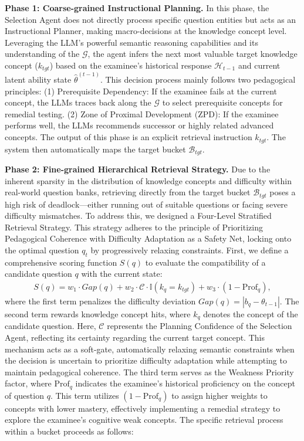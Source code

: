 \textbf{Phase 1: Coarse-grained Instructional Planning.} In this phase, the Selection Agent does not directly process specific question entities but acts as an Instructional Planner, making macro-decisions at the knowledge concept level. Leveraging the LLM's powerful semantic reasoning capabilities and its understanding of the  $\mathcal{G}$, the agent infers the next most valuable target knowledge concept ($k_{tgt}$) based on the examinee's historical response  $\mathcal{H}_{t-1}$ and current latent ability state $\hat{\theta}^{(t-1)}$. This decision process mainly follows two pedagogical principles:
(1) Prerequisite Dependency: If the examinee fails at the current concept, the LLMs traces back along the $\mathcal{G}$ to select prerequisite concepts for remedial testing.
(2) Zone of Proximal Development (ZPD)\cite{wass2014sharpening}: If the examinee performs well, the LLMs recommends successor or highly related advanced concepts.
The output of this phase is an explicit retrieval instruction $k_{tgt}$. The system then automatically maps the target  bucket  $\mathcal{B}_{tgt}$.

\textbf{Phase 2: Fine-grained Hierarchical Retrieval Strategy.} Due to the inherent sparsity in the distribution of knowledge concepts and difficulty within real-world question banks, retrieving directly from the target bucket $\mathcal{B}_{tgt}$ poses a high risk of deadlock—either running out of suitable questions or facing severe difficulty mismatches. To address this, we designed a Four-Level Stratified Retrieval Strategy. This strategy adheres to the principle of Prioritizing Pedagogical Coherence with Difficulty Adaptation as a Safety Net, locking onto the optimal question $q_t$ by progressively relaxing constraints. First, we define a comprehensive scoring function $S(q)$ to evaluate the compatibility of a candidate question $q$ with the current state:
\begin{align}
    S(q) = w_1 \cdot Gap(q) + w_2 \cdot \mathcal{C} \cdot \mathbb{I}(k_q = k_{tgt}) + w_3 \cdot (1 - \text{Prof}_q),
\end{align}
where the first term penalizes the difficulty deviation $Gap(q) = |b_q - \theta_{t-1}|$. The second term rewards knowledge concept hits, where $k_q$ denotes the concept of the candidate question. Here, $\mathcal{C}$ represents the Planning Confidence of the Selection Agent, reflecting its certainty regarding the current target concept. This mechanism acts as a soft-gate, automatically relaxing semantic constraints when the decision is uncertain to prioritize difficulty adaptation while attempting to maintain pedagogical coherence. The third term serves as the Weakness Priority factor, where $\text{Prof}_q$ indicates the examinee's historical proficiency on the concept of question $q$. This term utilizes $(1 - \text{Prof}_q)$ to assign higher weights to concepts with lower mastery, effectively implementing a remedial strategy to explore the examinee's cognitive weak concepts. The specific retrieval process within a bucket proceeds as follows:

